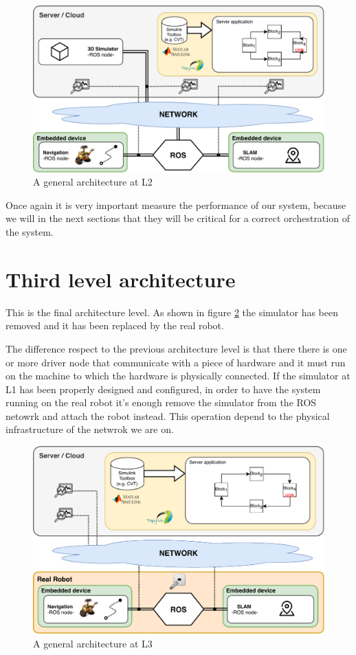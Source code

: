 \begin{figure}[htbp]
	\centering
	\includegraphics[width=\textwidth]{images/L2-arch}
	\caption{A general architecture at L2}
	\label{fig:l2arch}
\end{figure}


Once again it is very important measure the performance of our system, because we will in the next sections that they will be critical for a correct orchestration of the system.


\section{Third level architecture}
This is the final architecture level. As shown in figure \ref{fig:l3arch} the simulator has been removed and it has been replaced by the real robot.

The difference respect to the previous architecture level is that there there is one or more driver node that communicate with a piece of hardware and it must run on the machine to which the hardware is physically connected.
If the simulator  at L1 has been properly designed and configured, in order to have the system running on the real robot it's enough remove the simulator from the ROS netowrk and attach the robot instead. This operation depend to the physical infrastructure of the netwrok we are on. 

\begin{figure}[htbp]
	\centering
	\includegraphics[width=\textwidth]{images/L3-arch}
	\caption{A general architecture at L3}
	\label{fig:l3arch}
\end{figure}


